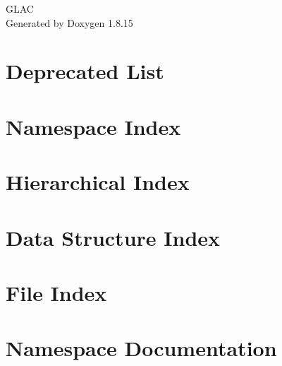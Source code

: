 \let\mypdfximage\pdfximage\def\pdfximage{\immediate\mypdfximage}\documentclass[twoside]{book}
\newcommand{\+}{\discretionary{\mbox{\scriptsize$\hookleftarrow$}}{}{}}
\newcommand{\clearemptydoublepage}{%
  \newpage{\pagestyle{empty}\cleardoublepage}%
}
\begin{document}
\hypersetup{pageanchor=false,
             bookmarksnumbered=true,
             pdfencoding=unicode
            }
\begin{titlepage}
\vspace*{7cm}
\begin{center}%
{\Large G\+L\+AC }\\
\vspace*{1cm}
{\large Generated by Doxygen 1.8.15}\\
\end{center}
\end{titlepage}
\clearemptydoublepage
{}
\tableofcontents
\clearemptydoublepage
{}
\hypersetup{pageanchor=true}

\chapter{Deprecated List}
\label{deprecated}

\chapter{Namespace Index}

\chapter{Hierarchical Index}

\chapter{Data Structure Index}

\chapter{File Index}

\chapter{Namespace Documentation}







\end{document}
